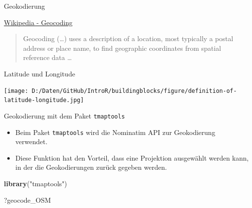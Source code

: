 \documentclass[ignorenonframetext,]{beamer}
\newenvironment{Shaded}{\begin{snugshade}}{\end{snugshade}}
\newcommand{\KeywordTok}[1]{\textcolor[rgb]{0.26,0.66,0.93}{\textbf{#1}}}
\newcommand{\StringTok}[1]{\textcolor[rgb]{0.02,0.61,0.04}{#1}}
\newcommand{\NormalTok}[1]{\textcolor[rgb]{0.74,0.68,0.62}{#1}}
\providecommand{\tightlist}{%
  \setlength{\itemsep}{0pt}\setlength{\parskip}{0pt}}
\begin{document}
\begin{frame}{Geokodierung}

\begin{block}{\href{https://github.com/adam-p/markdown-here/wiki/Markdown-Cheatsheet\#blockquotes}{Wikipedia
- Geocoding}}

\begin{quote}
Geocoding (\ldots{}) uses a description of a location, most typically a
postal address or place name, to find geographic coordinates from
spatial reference data \ldots{}
\end{quote}

\end{block}

\end{frame}

\begin{frame}{Latitude und Longitude}

\texttt{[image: D:/Daten/GitHub/IntroR/buildingblocks/figure/definition-of-latitude-longitude.jpg]}

\end{frame}

\begin{frame}[fragile]{Geokodierung mit dem Paket \texttt{tmaptools}}

\begin{itemize}
\tightlist
\item
  Beim Paket \texttt{tmaptools} wird die Nominatim API zur Geokodierung
  verwendet.
\item
  Diese Funktion hat den Vorteil, dass eine Projektion ausgewählt werden
  kann, in der die Geokodierungen zurück gegeben werden.
\end{itemize}

\begin{Shaded}
\begin{Highlighting}[]
\KeywordTok{library}\NormalTok{(}\StringTok{"tmaptools"}\NormalTok{)}
\end{Highlighting}
\end{Shaded}

\begin{Shaded}
\begin{Highlighting}[]
\NormalTok{?geocode_OSM}
\end{Highlighting}
\end{Shaded}

\end{frame}
\end{document}
